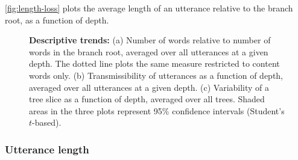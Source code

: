 \documentclass[a4paper,fleqn]{cas-dc}
\begin{document}
\cref{fig:length-loss} plots the average length of an utterance relative to the branch root, as a function of depth.



\begin{figure}
  \centering
  \caption{
  \textbf{Descriptive trends:}
  (a) Number of words relative to number of words in the branch root, averaged over all utterances at a given depth. The dotted line plots the same measure restricted to content words only.
  (b) Transmissibility of utterances as a function of depth, averaged over all utterances at a given depth.
  (c) Variability of a tree slice as a function of depth, averaged over all trees.
  Shaded areas in the three plots represent 95\% confidence intervals (Student's $t$-based).
  }
  \label{fig:general-trends}
\end{figure}


\subsubsection{Utterance length}\label{utterance-length}
\end{document}
